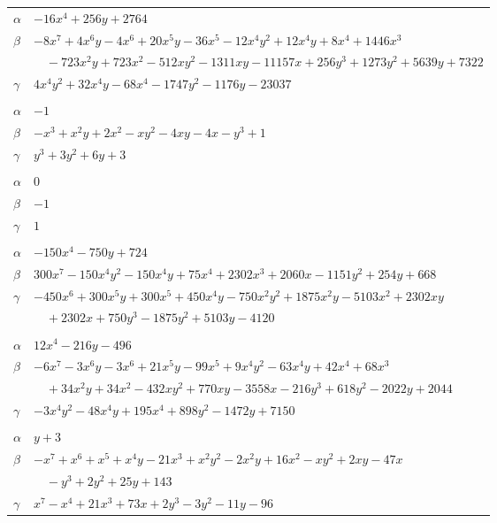 \documentclass[11pt]{article}
\begin{document}
\begin{longtable}{@{}ll@{}}
$\alpha$ & $-16x^{4}+256y+2764$\\
$\beta$ & $-8x^{7}+4x^{6}y-4x^{6}+20x^{5}y-36x^{5}-12x^{4}y^{2}+12x^{4}y+8x^{4}+1446x^{3}$\\
 & $\quad -723x^{2}y+723x^{2}-512xy^{2}-1311xy-11157x+256y^{3}+1273y^{2}+5639y+7322$\\
$\gamma$ & $4x^{4}y^{2}+32x^{4}y-68x^{4}-1747y^{2}-1176y-23037$\\
\addlinespace[3pt]
\multicolumn{2}{@{}l}{$\{i,j\}=\{10,37\}$, $k_{ij}=3$}\\
$\alpha$ & $-1$\\
$\beta$ & $-x^{3}+x^{2}y+2x^{2}-xy^{2}-4xy-4x-y^{3}+1$\\
$\gamma$ & $y^{3}+3y^{2}+6y+3$\\
\addlinespace[3pt]
\multicolumn{2}{@{}l}{$\{i,j\}=\{11,36\}$, $k_{ij}=2$}\\
$\alpha$ & $0$\\
$\beta$ & $-1$\\
$\gamma$ & $1$\\
\addlinespace[3pt]
\multicolumn{2}{@{}l}{$\{i,j\}=\{11,40\}$, $k_{ij}=2^{3}\cdot 7$}\\
$\alpha$ & $-150x^{4}-750y+724$\\
$\beta$ & $300x^{7}-150x^{4}y^{2}-150x^{4}y+75x^{4}+2302x^{3}+2060x-1151y^{2}+254y+668$\\
$\gamma$ & $-450x^{6}+300x^{5}y+300x^{5}+450x^{4}y-750x^{2}y^{2}+1875x^{2}y-5103x^{2}+2302xy$\\
 & $\quad +2302x+750y^{3}-1875y^{2}+5103y-4120$\\
\addlinespace[3pt]
\multicolumn{2}{@{}l}{$\{i,j\}=\{11,44\}$, $k_{ij}=2^{4}\cdot 3\cdot 5\cdot 7^{2}$}\\
$\alpha$ & $12x^{4}-216y-496$\\
$\beta$ & $-6x^{7}-3x^{6}y-3x^{6}+21x^{5}y-99x^{5}+9x^{4}y^{2}-63x^{4}y+42x^{4}+68x^{3}$\\
 & $\quad +34x^{2}y+34x^{2}-432xy^{2}+770xy-3558x-216y^{3}+618y^{2}-2022y+2044$\\
$\gamma$ & $-3x^{4}y^{2}-48x^{4}y+195x^{4}+898y^{2}-1472y+7150$\\
\addlinespace[3pt]
\multicolumn{2}{@{}l}{$\{i,j\}=\{14,41\}$, $k_{ij}=3\cdot 5\cdot 13$}\\
$\alpha$ & $y+3$\\
$\beta$ & $-x^{7}+x^{6}+x^{5}+x^{4}y-21x^{3}+x^{2}y^{2}-2x^{2}y+16x^{2}-xy^{2}+2xy-47x$\\
 & $\quad -y^{3}+2y^{2}+25y+143$\\
$\gamma$ & $x^{7}-x^{4}+21x^{3}+73x+2y^{3}-3y^{2}-11y-96$\\

\end{longtable}
\end{document}
